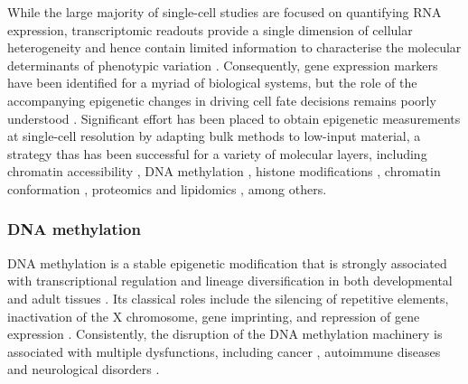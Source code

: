 While the large majority of single-cell studies are focused on quantifying RNA expression, transcriptomic readouts provide a single dimension of cellular heterogeneity and hence contain limited information to characterise the molecular determinants of phenotypic variation \cite{Ritchie2015}. Consequently, gene expression markers have been identified for a myriad of biological systems, but the role of the accompanying epigenetic changes in driving cell fate decisions remains poorly understood \cite{Griffiths2018,Kelsey2017,Bheda2014}. Significant effort has been placed to obtain epigenetic measurements at single-cell resolution by adapting bulk methods to low-input material, a strategy thas has been successful for a variety of molecular layers, including chromatin accessibility \cite{Cusanovich2015,Cao2018,Chen2018}, DNA methylation \cite{Smallwood2014}, histone modifications \cite{Ku2019}, chromatin conformation \cite{Ku2019}, proteomics \cite{Specht2018} and lipidomics \cite{Thiele2019}, among others.

\subsubsection{DNA methylation} \label{section:dna_methylation}

DNA methylation is a stable epigenetic modification that is strongly associated with transcriptional regulation and lineage diversification in both developmental and adult tissues \cite{Jin2018, Harrison2011, Lee2014, Smith2013}. Its classical roles include the silencing of repetitive elements, inactivation of the X chromosome, gene imprinting, and repression of gene expression \cite{Jones2012}. Consistently, the disruption of the DNA methylation machinery is associated with multiple dysfunctions, including cancer \cite{Baylin2011}, autoimmune diseases \cite{Liu2013} and neurological disorders \cite{Amir1999}.


